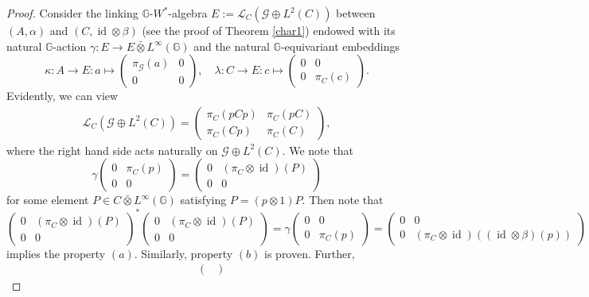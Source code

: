 \documentclass[reqno]{amsart}
\numberwithin{equation}{section}
\DeclareMathOperator{\id}{\mathrm{id}}
\newcommand{\G}{\mathbb{G}}
\newcommand{\ovot}{\bar{\otimes}}
\begin{document}
\begin{proof}
Consider the linking $\G$-$W^*$-algebra $E:=\mathscr{L}_C(\mathcal{G}\oplus L^2(C))$ between $(A, \alpha)$ and $(C, \id \otimes \beta)$ (see the proof of Theorem \ref{char1}) endowed with its natural $\G$-action $\gamma: E\to E\ovot L^\infty(\G)$
and the natural $\G$-equivariant embeddings
$$\kappa: A \to E: a \mapsto \begin{pmatrix}
    \pi_\mathcal{G}(a) & 0 \\ 0 & 0
\end{pmatrix}, \quad \lambda: C \to E: c \mapsto \begin{pmatrix}
    0 & 0 \\ 0 & \pi_C(c)
\end{pmatrix}.$$
Evidently, we can view
\begin{align*}
    \mathscr{L}_C(\mathcal{G}\oplus L^2(C))= \begin{pmatrix}
        \pi_C(pCp) & \pi_C(pC) \\ \pi_C(Cp) & \pi_C(C)
    \end{pmatrix},
\end{align*}
 where the right hand side acts naturally on $\mathcal{G}\oplus L^2(C)$. We note that 
$$ \gamma\begin{pmatrix}
    0 & \pi_C(p) \\ 0 & 0
\end{pmatrix}  = \begin{pmatrix}
    0 & (\pi_C\otimes \id)(P) \\ 0 & 0
\end{pmatrix}$$
for some element $P\in C \ovot L^\infty(\G)$ satisfying $P=(p\otimes 1)P$. Then note that 
$$\begin{pmatrix}
    0 & (\pi_C\otimes \id)(P) \\ 0 & 0
\end{pmatrix}^* \begin{pmatrix}
    0 & (\pi_C\otimes \id)(P) \\ 0 & 0
\end{pmatrix} = \gamma \begin{pmatrix}
    0 & 0 \\ 0 & \pi_C(p)
\end{pmatrix}= \begin{pmatrix}
    0 & 0 \\ 0 & (\pi_C \otimes \id)((\id \otimes \beta)(p))
\end{pmatrix}$$
implies the property $(a)$. Similarly, property $(b)$ is proven. Further,
\begin{align*}
    &\begin{pmatrix}

\end{pmatrix}
\end{align*}
\end{proof}
\end{document}
